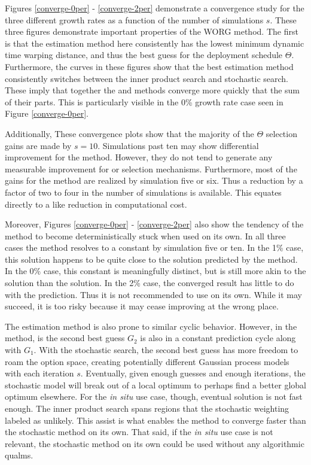 Figures \ref{converge-0per} - \ref{converge-2per} demonstrate a convergence
study for the three
different growth rates as a function of the number of simulations $s$.
These three figures demonstrate important properties of the WORG method.
The first is that the \allflag estimation method here consistently has
the lowest minimum dynamic time warping distance, and thus the best guess
for the deployment schedule $\Theta$.  Furthermore, the \allflag curves
in these figures show that the best estimation method consistently switches
between the inner product search and stochastic search. These imply
that together the \stochastic and \innerprod methods converge more quickly
that the sum of their parts.  This is particularly visible in the 0\% growth
rate case seen in Figure \ref{converge-0per}.

Additionally, These convergence plots show that the majority of the
$\Theta$ selection gains are made by $s=10$.  Simulations past ten may
show differential improvement for the \allflag method.  However, they
do not tend to generate any measurable improvement for \stochastic or
\innerprod selection mechanisms. Furthermore, most of the gains for the
\allflag method are realized by simulation five or six. Thus a reduction
by a factor of two to four in the number of simulations is available.
This equates directly to a like reduction in computational cost.

Moreover,
Figures \ref{converge-0per} - \ref{converge-2per} also show the tendency of
the \innerprod method to become deterministically stuck when used on its own.
In all three cases the \innerprod method resolves to a constant by
simulation five or ten.  In the 1\% case, this solution happens to be quite close
to the solution predicted by the \allflag method.  In the 0\% case, this
constant is meaningfully distinct, but is still more akin to the \stochastic
solution than the \allflag solution.  In the 2\% case, the converged \innerprod
result has little to do with the \allflag prediction.  Thus it is not
recommended to use \innerprod on its own. While it may succeed, it is too
risky because it may cease improving at the wrong place.

The \stochastic estimation method is also prone to similar cyclic behavior.
However, in the \innerprod method,
is the second best guess $G_2$ is also in a constant prediction cycle along
with $G_1$.  With the stochastic search, the second best
guess has more freedom to roam the option space, creating potentially
different Gaussian process models with each iteration $s$.  Eventually, given
enough guesses and enough iterations, the stochastic model will break
out of a local optimum to perhaps find a better global optimum elsewhere.
For the \emph{in situ} use case, though, eventual solution is not fast
enough.  The inner product search spans regions that the stochastic weighting
labeled as unlikely.  This assist is what enables the \allflag method
to converge faster than the stochastic method on its own.  That said,
if the \emph{in situ} use case is not relevant, the stochastic method on
its own could be used without any algorithmic qualms.

